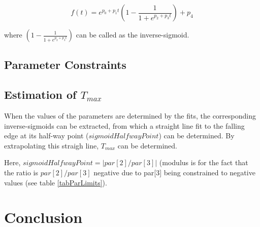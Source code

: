 \documentclass[12pt,epsfig]{article}
\def\tmax{$T_{max}$ }
\begin{document}
\begin{equation}
    \label{T0fit}
    f(t) = e^{p_0 + p_1t} (1 - \frac{1}{1 + e^{p_2 + p_3t}})  + p_4
\end{equation}

where $(1 - \frac{1}{1 + e^{p_2 + p_3t}})$ can be called as the inverse-sigmoid.


\subsection{Parameter Constraints}



\subsection{Estimation of \tmax}

When the values of the parameters are determined by the fits, the corresponding inverse-sigmoids 
can be extracted, from which a straight line fit to the falling edge at its half-way point ($sigmoidHalfwayPoint$)
can be determined. By extrapolating this straigh line, \tmax can be determined.

Here, $sigmoidHalfwayPoint = |par[2]/par[3]|$ (modulus is for the fact that the ratio is 
$par[2]/par[3]$ negative due to par[3] being constrained to negative values (see 
table \ref{tabParLimits}).



\section{Conclusion}



\appendix
\appendixpage
\end{document}
